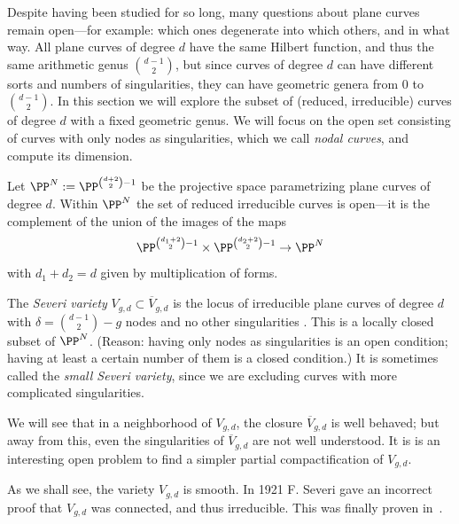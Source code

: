 Despite having been studied for so long, many questions about plane curves remain open---for example: which ones degenerate into which others, and in what way. All plane curves of degree $d$ have the same Hilbert function, and thus the same arithmetic genus
$\binom{d-1}{2}$, but since curves of degree $d$ can have different sorts and numbers of singularities, they can have geometric genera from 0 to $\binom{d-1}{2}$. In this section we will explore the subset of (reduced, irreducible) curves of degree $d$ with a fixed geometric genus. We will focus on the open set consisting of curves with only nodes as singularities, which we call \emph{nodal curves}, and compute its dimension. 

\def\Vdg{{V_{g,d}}}
\def\Vdgbar{{\overline{V}_{g,d}}} 

Let $\PP^N := \PP^{{d+2\choose 2} - 1}$ be the projective space parametrizing plane curves of degree $d$.
Within $\PP^N$ the set of reduced irreducible curves is open---it is the complement of the union of the images of the maps 
$$
\PP^{{d_1+2\choose 2} - 1}\times\PP^{{d_2+2\choose 2}-1} \to \PP^N
$$ 
with $d_1+d_2 = d$ given by multiplication of forms. 

\begin{propdef}
The \emph{Severi variety} $V_{g,d} \subset \Vdgbar$ is the locus of irreducible plane curves of degree $d$ with $\delta = \binom{d-1}{2} - g$ nodes and no other singularities . This is a locally closed subset of $\PP^N$.
(Reason: having only nodes as singularities is an open condition; having at least a certain number of them
is a closed condition.)
It is sometimes
called the \emph{small Severi variety}, since we are excluding curves with more complicated singularities.
\end{propdef}


We will see that in a neighborhood of  $ {V}_{g,d}$,  the closure $\overline V_{g,d}$  is well behaved; but away from this,
even the singularities of $\overline V_{g,d}$  are not well understood. It is is an interesting open problem to find a simpler partial compactification of $ V_{g,d}$. 


\begin{fact}\label{severi irreducible}
As we shall see, the variety $V_{g,d}$ is smooth. In 1921 F. Severi gave an incorrect proof that $\Vdg$ was connected, and thus irreducible. This was finally proven in~\cite{MR837522}.
\end{fact}


